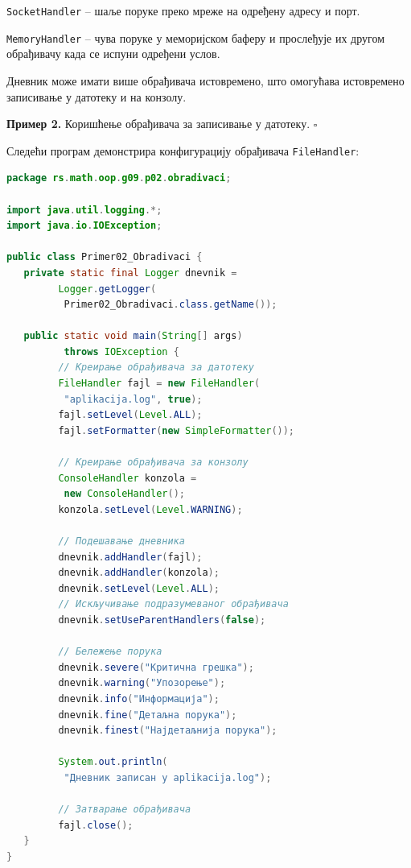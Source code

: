 \texttt{SocketHandler} – шаље поруке преко мреже на одређену адресу и порт.

\texttt{MemoryHandler} – чува поруке у меморијском баферу и прослеђује их другом обрађивачу када се испуни одређени услов.

Дневник може имати више обрађивача истовремено, што омогућава истовремено записивање у датотеку и на конзолу.


\bigskip

\noindent \textbf{Пример 2.} Коришћење обрађивача за записивање у датотеку. $\square$

\medskip

Следећи програм демонстрира конфигурацију обрађивача \texttt{FileHandler}:


\begin{lstlisting}[language=Java]
package rs.math.oop.g09.p02.obradivaci;
 
import java.util.logging.*;
import java.io.IOException;
 
public class Primer02_Obradivaci {
   private static final Logger dnevnik =
         Logger.getLogger(
          Primer02_Obradivaci.class.getName());
 
   public static void main(String[] args)
          throws IOException {
         // Креирање обрађивача за датотеку
         FileHandler fajl = new FileHandler(
          "aplikacija.log", true);
         fajl.setLevel(Level.ALL);
         fajl.setFormatter(new SimpleFormatter());
 
         // Креирање обрађивача за конзолу
         ConsoleHandler konzola =
          new ConsoleHandler();
         konzola.setLevel(Level.WARNING);
 
         // Подешавање дневника
         dnevnik.addHandler(fajl);
         dnevnik.addHandler(konzola);
         dnevnik.setLevel(Level.ALL);
         // Искључивање подразумеваног обрађивача
         dnevnik.setUseParentHandlers(false);
 
         // Бележење порука
         dnevnik.severe("Критична грешка");
         dnevnik.warning("Упозорење");
         dnevnik.info("Информација");
         dnevnik.fine("Детаљна порука");
         dnevnik.finest("Најдетаљнија порука");
 
         System.out.println(
          "Дневник записан у aplikacija.log");
 
         // Затварање обрађивача
         fajl.close();
   }
}
\end{lstlisting}



